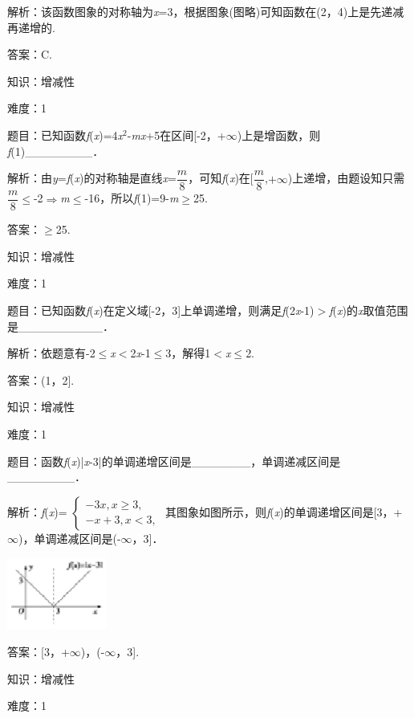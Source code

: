 \documentclass{article} %
\begin{document}
解析：该函数图象的对称轴为\textit{x}=3，根据图象(图略)可知函数在(2，4)上是先递减再递增的.

答案：C.

知识：增减性

难度：1

题目：已知函数\textit{f}(\textit{x})=4\textit{x}${}^{2}$-\textit{mx}+5在区间[-2，+$\mathrm{\infty}$)上是增函数，则\textit{f}(1)\_\_\_\_\_\_\_\_．

解析：由\textit{y}=\textit{f}(\textit{x})的对称轴是直线\textit{x}=$\dfrac{m}{8}$，可知\textit{f}(\textit{x})在[$\dfrac{m}{8}$,$+\infty$)上递增，由题设知只需$\dfrac{m}{8}$$\mathrm{\le}$-2$\mathrm{\Rightarrow }$\textit{m}$\mathrm{\le}$-16，所以\textit{f}(1)=9-\textit{m}$\mathrm{\ge}$25.

答案：$\mathrm{\ge}$25.

知识：增减性

难度：1

题目：已知函数\textit{f}(\textit{x})在定义域[-2，3]上单调递增，则满足\textit{f}(2\textit{x}-1)$\mathrm{>}$\textit{f}(\textit{x})的\textit{x}取值范围是\_\_\_\_\_\_\_\_\_\_．

解析：依题意有-2$\mathrm{\le}$\textit{x}$\mathrm{<}$2\textit{x}-1$\mathrm{\le}$3，解得1$\mathrm{<}$\textit{x}$\mathrm{\le}$2.

答案：(1，2].

知识：增减性

难度：1

题目：函数\textit{f}(\textit{x})|\textit{x}-3|的单调递增区间是\_\_\_\_\_\_\_，单调递减区间是\_\_\_\_\_\_\_\_．

解析：\textit{f}(\textit{x})=
$\left\{
\begin{array}{l}
	-3x, x\ge 3,\\
	-x+3, x<3,
\end{array}
\right.$
其图象如图所示，则\textit{f}(\textit{x})的单调递增区间是[3，+$\mathrm{\infty}$)，单调递减区间是(-$\mathrm{\infty}$，3]．

\includegraphics*[width=1.29in, height=0.93in, keepaspectratio=false]{image35}

答案：[3，+$\mathrm{\infty}$)，(-$\mathrm{\infty}$，3].

知识：增减性

难度：1
\end{document}
